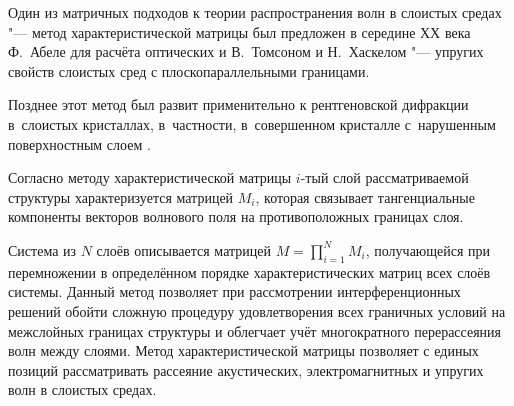 











\date{20/XII/2010} %









\maketitle




Один из матричных подходов к теории распространения волн в слоистых средах "--- метод характеристической матрицы был предложен в середине ХХ века Ф.~Абеле \cite{belyayev:Abeles} для расчёта оптических и В.~Томсоном \cite{belyayev:Thomson} и Н.~Хаскелом \cite{belyayev:Haskell} "--- упругих свойств слоистых сред с плоскопараллельными границами. 

Позднее этот метод был развит применительно к рентгеновской дифракции в~слоистых кристаллах, в~частности, в~совершенном кристалле с~нарушенным поверхностным слоем \cite{belyayev:Belyayev0}. 



Согласно методу характеристической матрицы $i$-тый слой рассматриваемой структуры характеризуется  матрицей $M_i$, которая связывает тангенциальные компоненты векторов волнового поля на противоположных границах слоя. 

Система из $N$ слоёв описывается матрицей $M=\prod_{i=1}^NM_i$, получающейся при перемножении в определённом порядке характеристических матриц всех слоёв системы. Данный метод позволяет при рассмотрении интерференционных решений обойти сложную процедуру удовлетворения всех граничных условий на межслойных границах структуры и облегчает учёт многократного перерассеяния волн между слоями. Метод характеристической матрицы позволяет с единых позиций рассматривать рассеяние акустических, электромагнитных и упругих волн в слоистых средах.



